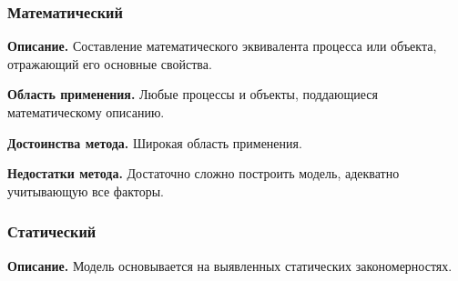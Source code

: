 
\subsubsection*{Математический}
\textbf{Описание.} Составление математического эквивалента процесса или объекта, отражающий его основные свойства.

\textbf{Область применения.} Любые процессы и объекты, поддающиеся математическому описанию.

\textbf{Достоинства метода.} Широкая область применения.

\textbf{Недостатки метода.} Достаточно сложно построить модель, адекватно учитывающую все факторы.

\subsubsection*{Статический}
\textbf{Описание.} Модель основывается на выявленных статических закономерностях.

